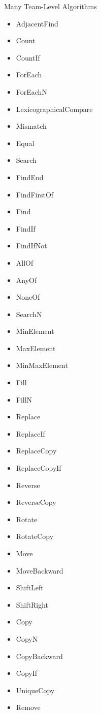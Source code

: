 \begin{frame}[fragile]{Many Team-Level Algorithms}

\begin{itemize}
    \item AdjacentFind
    \item Count
    \item CountIf
    \item ForEach
    \item ForEachN
    \item LexicographicalCompare
    \item Mismatch
    \item Equal
    \item Search
    \item FindEnd
    \item FindFirstOf
    \item Find
    \item FindIf
    \item FindIfNot
    \item AllOf
    \item AnyOf
    \item NoneOf
    \item SearchN
    \item MinElement
    \item MaxElement
    \item MinMaxElement
    \item Fill
    \item FillN
    \item Replace
    \item ReplaceIf
    \item ReplaceCopy
    \item ReplaceCopyIf
    \item Reverse
    \item ReverseCopy
    \item Rotate
    \item RotateCopy
    \item Move
    \item MoveBackward
    \item ShiftLeft
    \item ShiftRight
    \item Copy
    \item CopyN
    \item CopyBackward
    \item CopyIf
    \item UniqueCopy
    \item Remove

\end{itemize}
\end{frame}

